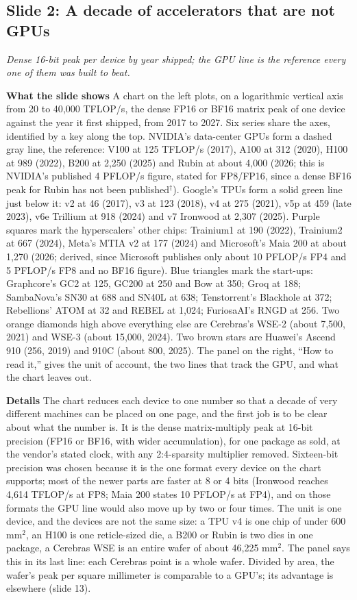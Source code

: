 \documentclass[11pt,letterpaper]{article}
\newcommand{\slide}[3]{%
  \subsection[Slide #1: #2]{Slide #1: #2}%
  {\color{muted}\itshape #3\par}\medskip}
\newcommand{\para}[1]{\medskip\noindent\textbf{#1}\quad}
\begin{document}
\slide{2}{A decade of accelerators that are not GPUs}{Dense 16-bit peak per device by year shipped; the GPU line is the reference every one of them was built to beat.}

\para{What the slide shows} A chart on the left plots, on a logarithmic vertical axis from 20 to 40{,}000 TFLOP/s, the dense FP16 or BF16 matrix peak of one device against the year it first shipped, from 2017 to 2027. Six series share the axes, identified by a key along the top. NVIDIA's data-center GPUs form a dashed gray line, the reference: V100 at 125 TFLOP/s (2017), A100 at 312 (2020), H100 at 989 (2022), B200 at 2{,}250 (2025) and Rubin at about 4{,}000 (2026; this is NVIDIA's published 4 PFLOP/s figure, stated for FP8/FP16, since a dense BF16 peak for Rubin has not been published$^\dagger$). Google's TPUs form a solid green line just below it: v2 at 46 (2017), v3 at 123 (2018), v4 at 275 (2021), v5p at 459 (late 2023), v6e Trillium at 918 (2024) and v7 Ironwood at 2{,}307 (2025). Purple squares mark the hyperscalers' other chips: Trainium1 at 190 (2022), Trainium2 at 667 (2024), Meta's MTIA v2 at 177 (2024) and Microsoft's Maia 200 at about 1{,}270 (2026; derived, since Microsoft publishes only about 10 PFLOP/s FP4 and 5 PFLOP/s FP8 and no BF16 figure). Blue triangles mark the start-ups: Graphcore's GC2 at 125, GC200 at 250 and Bow at 350; Groq at 188; SambaNova's SN30 at 688 and SN40L at 638; Tenstorrent's Blackhole at 372; Rebellions' ATOM at 32 and REBEL at 1{,}024; FuriosaAI's RNGD at 256. Two orange diamonds high above everything else are Cerebras's WSE-2 (about 7{,}500, 2021) and WSE-3 (about 15{,}000, 2024). Two brown stars are Huawei's Ascend 910 (256, 2019) and 910C (about 800, 2025). The panel on the right, ``How to read it,'' gives the unit of account, the two lines that track the GPU, and what the chart leaves out.

\para{Details} The chart reduces each device to one number so that a decade of very different machines can be placed on one page, and the first job is to be clear about what the number is. It is the dense matrix-multiply peak at 16-bit precision (FP16 or BF16, with wider accumulation), for one package as sold, at the vendor's stated clock, with any 2:4-sparsity multiplier removed. Sixteen-bit precision was chosen because it is the one format every device on the chart supports; most of the newer parts are faster at 8 or 4 bits (Ironwood reaches 4{,}614 TFLOP/s at FP8; Maia 200 states 10 PFLOP/s at FP4), and on those formats the GPU line would also move up by two or four times. The unit is one device, and the devices are not the same size: a TPU v4 is one chip of under 600 mm$^2$, an H100 is one reticle-sized die, a B200 or Rubin is two dies in one package, a Cerebras WSE is an entire wafer of about 46{,}225 mm$^2$. The panel says this in its last line: each Cerebras point is a whole wafer. Divided by area, the wafer's peak per square millimeter is comparable to a GPU's; its advantage is elsewhere (slide 13).
\end{document}
